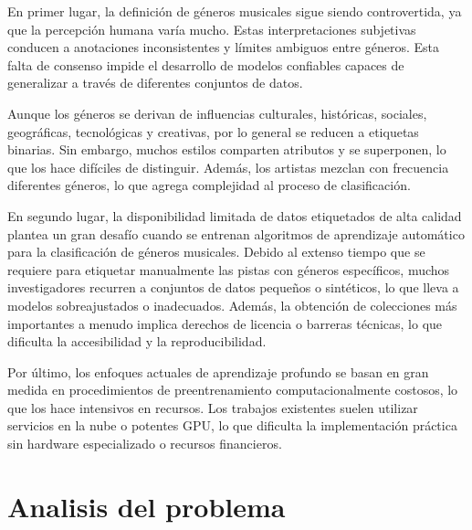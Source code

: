 \documentclass[colorinlistoftodos,twoside,twocolumn,10pt]{article} %
\begin{document}
En primer lugar, la definición de géneros musicales sigue siendo controvertida, ya que la percepción humana varía mucho. Estas interpretaciones subjetivas conducen a anotaciones inconsistentes  y límites ambiguos entre géneros. Esta falta de consenso impide el desarrollo de modelos confiables capaces de generalizar a través de diferentes conjuntos de datos.

Aunque los géneros se derivan de influencias culturales, históricas, sociales, geográficas, tecnológicas y creativas, por lo general se reducen a etiquetas binarias. Sin embargo, muchos estilos comparten atributos y se superponen, lo que los hace difíciles de distinguir. Además, los artistas mezclan con frecuencia diferentes géneros, lo que agrega complejidad al proceso de clasificación.

En segundo lugar, la disponibilidad limitada de datos etiquetados de alta calidad plantea un gran desafío cuando se entrenan algoritmos de aprendizaje automático para la clasificación de géneros musicales. Debido al extenso tiempo que se requiere para etiquetar manualmente las pistas con géneros específicos, muchos investigadores recurren a conjuntos de datos pequeños o sintéticos, lo que lleva a modelos sobreajustados o inadecuados. Además, la obtención de colecciones más importantes a menudo implica derechos de licencia o barreras técnicas, lo que dificulta la accesibilidad y la reproducibilidad.

Por último, los enfoques actuales de aprendizaje profundo se basan en gran medida en procedimientos de preentrenamiento computacionalmente costosos, lo que los hace intensivos en recursos. Los trabajos existentes suelen utilizar servicios en la nube o potentes GPU, lo que dificulta la implementación práctica sin hardware especializado o recursos financieros. 
	  

\section {Analisis del problema}
\end{document}
